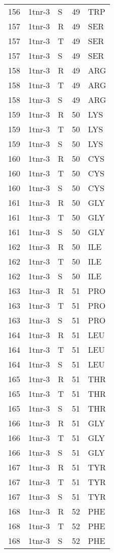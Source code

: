 \begin{longtable}[l]{l|l|l|l|l}
	156 & 1tnr-3 & S & 49 & TRP \\
	157 & 1tnr-3 & R & 49 & SER \\
	157 & 1tnr-3 & T & 49 & SER \\
	157 & 1tnr-3 & S & 49 & SER \\
	158 & 1tnr-3 & R & 49 & ARG \\
	158 & 1tnr-3 & T & 49 & ARG \\
	158 & 1tnr-3 & S & 49 & ARG \\
	159 & 1tnr-3 & R & 50 & LYS \\
	159 & 1tnr-3 & T & 50 & LYS \\
	159 & 1tnr-3 & S & 50 & LYS \\
	160 & 1tnr-3 & R & 50 & CYS \\
	160 & 1tnr-3 & T & 50 & CYS \\
	160 & 1tnr-3 & S & 50 & CYS \\
	161 & 1tnr-3 & R & 50 & GLY \\
	161 & 1tnr-3 & T & 50 & GLY \\
	161 & 1tnr-3 & S & 50 & GLY \\
	162 & 1tnr-3 & R & 50 & ILE \\
	162 & 1tnr-3 & T & 50 & ILE \\
	162 & 1tnr-3 & S & 50 & ILE \\
	163 & 1tnr-3 & R & 51 & PRO \\
	163 & 1tnr-3 & T & 51 & PRO \\
	163 & 1tnr-3 & S & 51 & PRO \\
	164 & 1tnr-3 & R & 51 & LEU \\
	164 & 1tnr-3 & T & 51 & LEU \\
	164 & 1tnr-3 & S & 51 & LEU \\
	165 & 1tnr-3 & R & 51 & THR \\
	165 & 1tnr-3 & T & 51 & THR \\
	165 & 1tnr-3 & S & 51 & THR \\
	166 & 1tnr-3 & R & 51 & GLY \\
	166 & 1tnr-3 & T & 51 & GLY \\
	166 & 1tnr-3 & S & 51 & GLY \\
	167 & 1tnr-3 & R & 51 & TYR \\
	167 & 1tnr-3 & T & 51 & TYR \\
	167 & 1tnr-3 & S & 51 & TYR \\
	168 & 1tnr-3 & R & 52 & PHE \\
	168 & 1tnr-3 & T & 52 & PHE \\
	168 & 1tnr-3 & S & 52 & PHE \\

\end{longtable}
